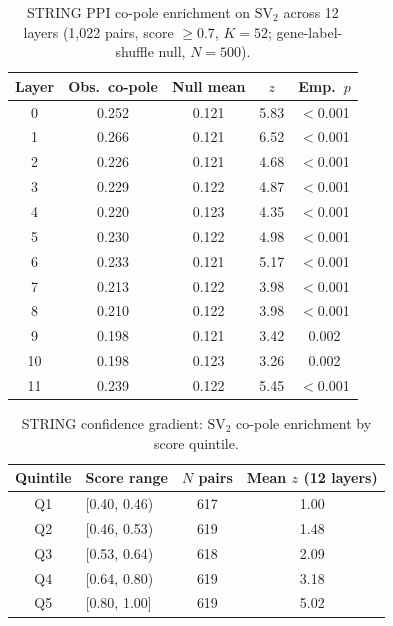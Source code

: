 \documentclass[12pt]{article}
\newcommand{\SV}[1]{\mathrm{SV}_{#1}}
\begin{document}
\begin{table}[!ht]
\centering
\caption{STRING PPI co-pole enrichment on $\SV{2}$ across 12 layers (1{,}022 pairs, score $\geq 0.7$, $K = 52$; gene-label-shuffle null, $N = 500$).}
\label{tab:ppi_all_layers}
\begin{tabular}{ccccc}
\toprule
Layer & Obs.\ co-pole & Null mean & $z$ & Emp.\ $p$ \\
\midrule
0  & 0.252 & 0.121 & 5.83 & $<$0.001 \\
1  & 0.266 & 0.121 & 6.52 & $<$0.001 \\
2  & 0.226 & 0.121 & 4.68 & $<$0.001 \\
3  & 0.229 & 0.122 & 4.87 & $<$0.001 \\
4  & 0.220 & 0.123 & 4.35 & $<$0.001 \\
5  & 0.230 & 0.122 & 4.98 & $<$0.001 \\
6  & 0.233 & 0.121 & 5.17 & $<$0.001 \\
7  & 0.213 & 0.122 & 3.98 & $<$0.001 \\
8  & 0.210 & 0.122 & 3.98 & $<$0.001 \\
9  & 0.198 & 0.121 & 3.42 & 0.002 \\
10 & 0.198 & 0.123 & 3.26 & 0.002 \\
11 & 0.239 & 0.122 & 5.45 & $<$0.001 \\
\bottomrule
\end{tabular}
\end{table}

\begin{table}[!ht]
\centering
\caption{STRING confidence gradient: $\SV{2}$ co-pole enrichment by score quintile.}
\label{tab:confidence_gradient}
\begin{tabular}{clcc}
\toprule
Quintile & Score range & $N$ pairs & Mean $z$ (12 layers) \\
\midrule
Q1 & [0.40, 0.46) & 617 & 1.00 \\
Q2 & [0.46, 0.53) & 619 & 1.48 \\
Q3 & [0.53, 0.64) & 618 & 2.09 \\
Q4 & [0.64, 0.80) & 619 & 3.18 \\
Q5 & [0.80, 1.00] & 619 & 5.02 \\
\bottomrule
\end{tabular}
\end{table}
\end{document}
